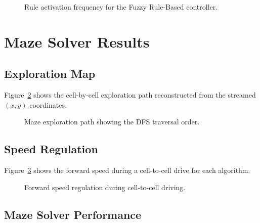 \begin{figure}[htbp]
    \centering
    \caption{Rule activation frequency for the Fuzzy Rule-Based controller.}
    \label{fig:rule-activation}
\end{figure}


\section{Maze Solver Results}
\label{sec:ms-results}

\subsection{Exploration Map}

Figure~\ref{fig:maze-map} shows the cell-by-cell exploration path reconstructed from the streamed $(x, y)$ coordinates.

\begin{figure}[htbp]
    \centering
    \caption{Maze exploration path showing the DFS traversal order.}
    \label{fig:maze-map}
\end{figure}

\subsection{Speed Regulation}

Figure~\ref{fig:ms-speed} shows the forward speed during a cell-to-cell drive for each algorithm.

\begin{figure}[htbp]
    \centering
    \caption{Forward speed regulation during cell-to-cell driving.}
    \label{fig:ms-speed}
\end{figure}

\subsection{Maze Solver Performance}

